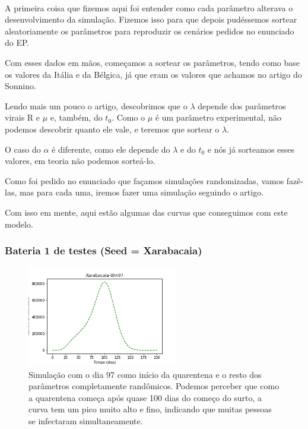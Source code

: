 \documentclass[11pt]{article}
\begin{document}
\paragraph{} A primeira coisa que fizemos aqui foi entender
como cada parâmetro alterava o desenvolvimento
da simulação. Fizemos isso para que depois pudéssemos
sortear aleatoriamente os parâmetros para reproduzir
os cenários pedidos no enunciado do EP.

Com esses dados em mãos, começamos a sortear
os parâmetros, tendo como base os valores da Itália e
da Bélgica, já que eram os valores que achamos
no artigo do Sonnino.

Lendo mais um pouco o artigo, descobrimos que o 
\(\lambda\) depende dos parâmetros virais R e \(\mu\) e,
também, do \(t_0\). Como o \(\mu\) é um parâmetro experimental,
não podemos descobrir quanto ele vale, e teremos que
sortear o \(\lambda\).

O caso do \(\alpha\) é diferente, como ele depende do
\(\lambda\) e do \(t_0\) e nós já sorteamos esses valores,
em teoria não podemos sorteá-lo.

Como foi pedido no enunciado que façamos simulações
randomizadas, vamos fazê-las, mas para cada uma,
iremos fazer uma simulação seguindo o artigo.

Com isso em mente, aqui estão algumas das curvas
que conseguimos com este modelo.
\newpage

\subsubsection{Bateria 1 de testes (Seed = Xarabacaia)}
\label{sec:orgcdb014a}
\begin{figure}[htbp]
\centering
\includegraphics[width=250px]{images/Xarabacaia-t0=97.png}
\caption{Simulação com o dia 97 como início da quarentena e o resto dos parâmetros completamente randômicos. Podemos perceber que como a quarentena começa após quase 100 dias do começo do surto, a curva tem um pico muito alto e fino, indicando que muitas pessoas se infectaram simultaneamente.}
\end{figure}
\end{document}
